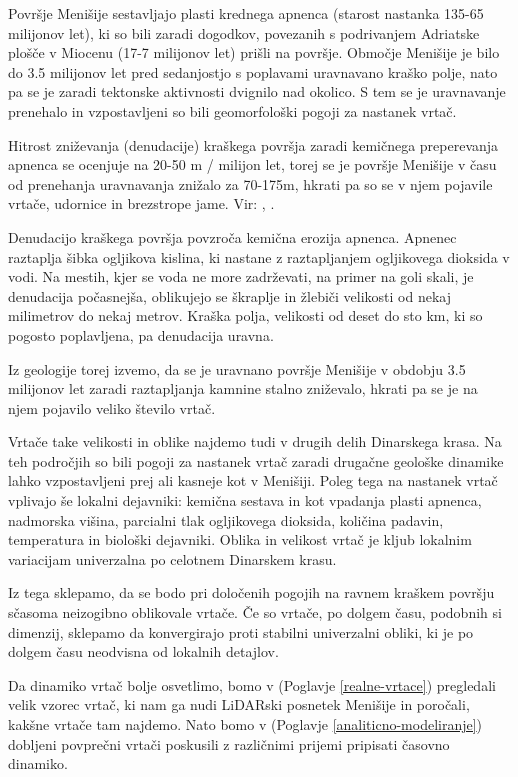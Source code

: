 \documentclass[a4paper, twoside, 12pt]{book}
\begin{document}
  Površje Menišije sestavljajo plasti krednega apnenca (starost nastanka 135-65 milijonov let), ki so bili zaradi dogodkov, povezanih s podrivanjem Adriatske plošče v Miocenu (17-7 milijonov let) prišli na površje. Območje Menišije je bilo do 3.5 milijonov let pred sedanjostjo s poplavami uravnavano kraško polje, nato pa se je zaradi tektonske aktivnosti dvignilo nad okolico. S tem se je uravnavanje prenehalo in vzpostavljeni so bili geomorfološki pogoji za nastanek vrtač.

Hitrost zniževanja (denudacije) kraškega površja zaradi kemičnega preperevanja apnenca se ocenjuje na 20-50 m / milijon let, torej se je površje Menišije v času od prenehanja uravnavanja znižalo za 70-175m, hkrati pa so se v njem pojavile vrtače, udornice in brezstrope jame. Vir: \cite{Vrabec2006}, \cite{Placer2010}.

Denudacijo kraškega površja povzroča kemična erozija apnenca. Apnenec raztaplja šibka ogljikova kislina, ki nastane z raztapljanjem ogljikovega dioksida v vodi. Na mestih, kjer se voda ne more zadrževati, na primer na goli skali, je denudacija počasnejša, oblikujejo se škraplje in žlebiči velikosti od nekaj milimetrov do nekaj metrov. Kraška polja, velikosti od deset do sto km, ki so pogosto poplavljena, pa denudacija uravna.

Iz geologije torej izvemo, da se je uravnano površje Menišije v obdobju 3.5 milijonov let zaradi raztapljanja kamnine stalno zniževalo, hkrati pa se je na njem pojavilo veliko število vrtač.

Vrtače take velikosti in oblike najdemo tudi v drugih delih Dinarskega krasa. Na teh področjih so bili pogoji za nastanek vrtač zaradi drugačne geološke dinamike lahko vzpostavljeni prej ali kasneje kot v Menišiji. Poleg tega na nastanek vrtač vplivajo še lokalni dejavniki: kemična sestava in kot vpadanja plasti apnenca, nadmorska višina, parcialni tlak ogljikovega dioksida, količina padavin, temperatura in biološki dejavniki. Oblika in velikost vrtač je kljub lokalnim variacijam univerzalna po celotnem Dinarskem krasu.

Iz tega sklepamo, da se bodo pri določenih pogojih na ravnem kraškem površju sčasoma neizogibno oblikovale vrtače. Če so vrtače, po dolgem času, podobnih si dimenzij, sklepamo da konvergirajo proti stabilni univerzalni obliki, ki je po dolgem času neodvisna od lokalnih detajlov.

Da dinamiko vrtač bolje osvetlimo, bomo v (Poglavje \ref{realne-vrtace}) pregledali velik vzorec vrtač, ki nam ga nudi LiDARski posnetek Menišije in poročali, kakšne vrtače tam najdemo. Nato bomo v (Poglavje \ref{analiticno-modeliranje}) dobljeni povprečni vrtači poskusili z različnimi prijemi pripisati časovno dinamiko.
\end{document}
